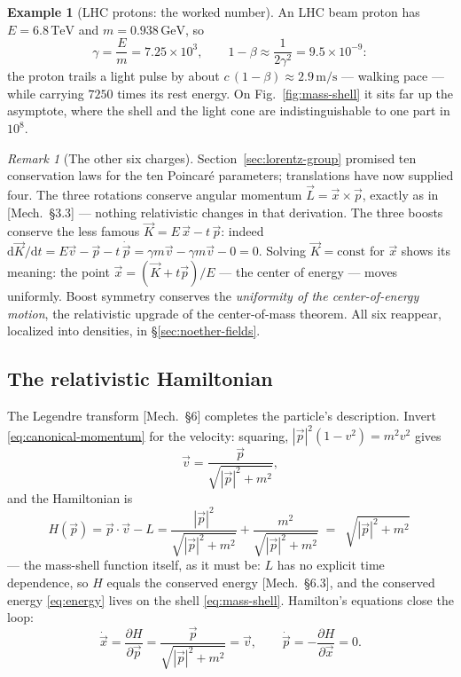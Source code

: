 \documentclass[11pt]{article}
\theoremstyle{plain}
\theoremstyle{definition}
\newtheorem{example}[theorem]{Example}
\theoremstyle{remark}
\newtheorem{remark}[theorem]{Remark}
\newcommand{\dd}{\mathrm{d}}
\newcommand{\pd}[2]{\frac{\partial #1}{\partial #2}}
\newcommand{\vx}{\vec{x}}
\newcommand{\vv}{\vec{v}}
\newcommand{\vp}{\vec{p}}
\begin{document}
\begin{example}[LHC protons: the worked number]\label{ex:lhc}
An LHC beam proton has $E = 6.8\,\mathrm{TeV}$ and
$m = 0.938\,\mathrm{GeV}$, so
\begin{equation}
  \gamma = \frac{E}{m} = 7.25\times 10^{3},
  \qquad
  1 - \beta \approx \frac{1}{2\gamma^2} = 9.5\times 10^{-9} :
\end{equation}
the proton trails a light pulse by about
$c\,(1-\beta) \approx 2.9\,\mathrm{m/s}$ --- walking pace --- while
carrying $7250$ times its rest energy. On Fig.~\ref{fig:mass-shell} it
sits far up the asymptote, where the shell and the light cone are
indistinguishable to one part in $10^8$.
\end{example}

\begin{remark}[The other six charges]\label{rem:ten-charges}
Section~\ref{sec:lorentz-group} promised ten conservation laws for the
ten Poincar\'e parameters; translations have now supplied four. The three
rotations conserve angular momentum $\vec L = \vx \times \vp$, exactly
as in [Mech.\ \S3.3] --- nothing relativistic changes in that
derivation. The three boosts conserve the less famous
$\vec K = E\,\vx - t\,\vp$: indeed
$\dd\vec K/\dd t = E\vv - \vp - t\,\dot{\vp} = \gamma m \vv - \gamma m
\vv - 0 = 0$. Solving $\vec K = \mathrm{const}$ for $\vx$ shows its
meaning: the point $\vx = (\vec K + t\vp)/E$ --- the center of energy
--- moves uniformly. Boost symmetry conserves the \emph{uniformity of
the center-of-energy motion}, the relativistic upgrade of the
center-of-mass theorem. All six reappear, localized into densities,
in \S\ref{sec:noether-fields}.
\end{remark}

\subsection{The relativistic Hamiltonian}
\label{sec:particle-hamiltonian}

The Legendre transform [Mech.\ \S6] completes the particle's
description. Invert \eqref{eq:canonical-momentum} for the velocity: squaring,
$|\vp|^2 (1 - v^2) = m^2 v^2$ gives
\begin{equation}
  \vv = \frac{\vp}{\sqrt{|\vp|^2 + m^2}},
\end{equation}
and the Hamiltonian is
\begin{equation}
  H(\vp)
  = \vp \cdot \vv - L
  = \frac{|\vp|^2}{\sqrt{|\vp|^2+m^2}}
    + \frac{m^2}{\sqrt{|\vp|^2+m^2}}
  \;=\;
  \boxed{\ \sqrt{|\vp|^2 + m^2}\ }
  \label{eq:relativistic-hamiltonian}
\end{equation}
--- the mass-shell function itself, as it must be: $L$ has no explicit
time dependence, so $H$ equals the conserved energy
[Mech.\ \S6.3], and the conserved energy \eqref{eq:energy} lives on
the shell \eqref{eq:mass-shell}. Hamilton's equations close the loop:
\begin{equation}
  \dot{\vx} = \pd{H}{\vp} = \frac{\vp}{\sqrt{|\vp|^2+m^2}} = \vv,
  \qquad
  \dot{\vp} = -\pd{H}{\vx} = 0 .
\end{equation}
\end{document}
